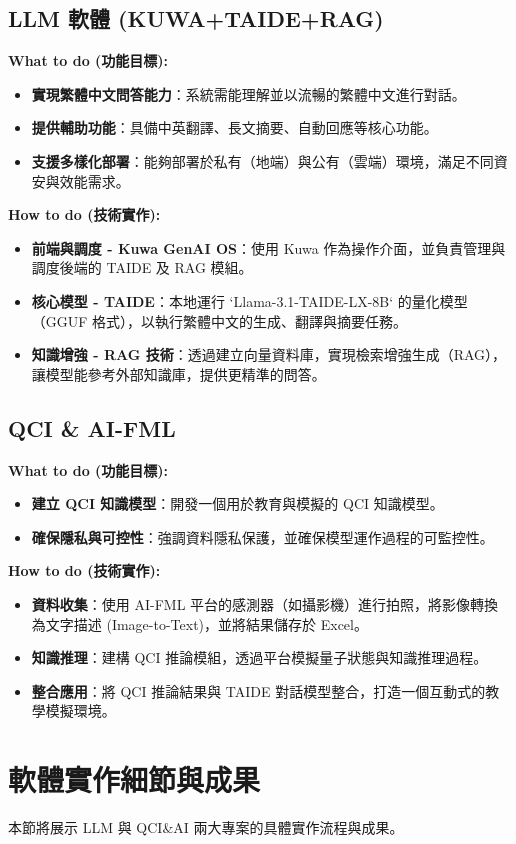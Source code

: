 \documentclass[twocolumn,11pt,a4paper]{article}
\begin{document}
\subsection{LLM 軟體 (KUWA+TAIDE+RAG)}
\textbf{What to do (功能目標):}
\begin{itemize}
    \item \textbf{實現繁體中文問答能力}：系統需能理解並以流暢的繁體中文進行對話。
    \item \textbf{提供輔助功能}：具備中英翻譯、長文摘要、自動回應等核心功能。
    \item \textbf{支援多樣化部署}：能夠部署於私有（地端）與公有（雲端）環境，滿足不同資安與效能需求。
\end{itemize}
\textbf{How to do (技術實作):}
\begin{itemize}
    \item \textbf{前端與調度 - Kuwa GenAI OS}：使用 Kuwa 作為操作介面，並負責管理與調度後端的 TAIDE 及 RAG 模組。
    \item \textbf{核心模型 - TAIDE}：本地運行 `Llama-3.1-TAIDE-LX-8B` 的量化模型（GGUF 格式），以執行繁體中文的生成、翻譯與摘要任務。
    \item \textbf{知識增強 - RAG 技術}：透過建立向量資料庫，實現檢索增強生成（RAG），讓模型能參考外部知識庫，提供更精準的問答。
\end{itemize}

\subsection{QCI \& AI-FML}
\textbf{What to do (功能目標):}
\begin{itemize}
    \item \textbf{建立 QCI 知識模型}：開發一個用於教育與模擬的 QCI 知識模型。
    \item \textbf{確保隱私與可控性}：強調資料隱私保護，並確保模型運作過程的可監控性。
\end{itemize}
\textbf{How to do (技術實作):}
\begin{itemize}
    \item \textbf{資料收集}：使用 AI-FML 平台的感測器（如攝影機）進行拍照，將影像轉換為文字描述 (Image-to-Text)，並將結果儲存於 Excel。
    \item \textbf{知識推理}：建構 QCI 推論模組，透過平台模擬量子狀態與知識推理過程。
    \item \textbf{整合應用}：將 QCI 推論結果與 TAIDE 對話模型整合，打造一個互動式的教學模擬環境。
\end{itemize}

\section{軟體實作細節與成果}
本節將展示 LLM 與 QCI\&AI 兩大專案的具體實作流程與成果。
\end{document}
